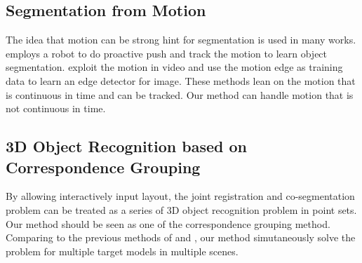 \subsection{Segmentation from Motion}
The idea that motion can be strong hint for segmentation is used in many works.\cite{Xu:2015:ACS:2816795.2818075} employs a robot to do proactive push and track the motion to learn object segmentation. \cite{unsupervisededge} exploit the motion in video and use the motion edge as training data to learn an edge detector for image. These methods lean on the motion that is continuous in time and can be tracked. Our method can handle motion that is not continuous in time.

\subsection{3D Object Recognition based on Correspondence Grouping}
By allowing interactively input layout, the joint registration and co-segmentation problem can be treated as a series of 3D object recognition problem in point sets. Our method should be seen as one of the correspondence grouping method. Comparing to the previous methods of \cite{hough} and \cite{LOF}, our method simutaneously solve the problem for multiple target models in multiple scenes.